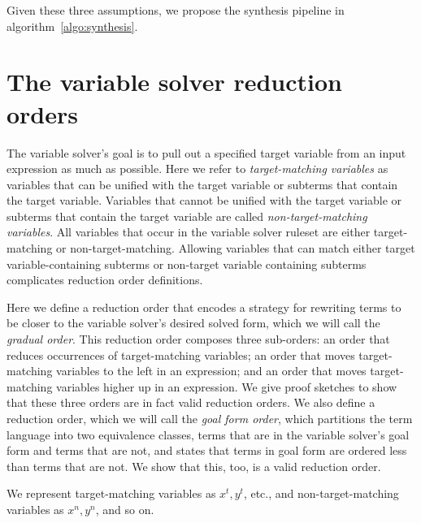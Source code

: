 Given these three assumptions, we propose the synthesis pipeline in algorithm~\ref{algo:synthesis}. 



\section{The variable solver reduction orders}

The variable solver's goal is to pull out a specified target variable from an input expression as much as possible.
Here we refer to \emph{target-matching variables} as variables that can be unified with the target variable or subterms that contain the target variable. Variables that cannot be unified with the target variable or subterms that contain the target variable are called \emph{non-target-matching variables}. All variables that occur in the variable solver ruleset are either target-matching or non-target-matching. Allowing variables that can match either target variable-containing subterms or non-target variable containing subterms complicates reduction order definitions. 

Here we define a reduction order that encodes a strategy for rewriting terms to be closer to the variable solver's desired solved form, which we will call the \emph{gradual order}. This reduction order composes three sub-orders: an order that reduces occurrences of target-matching variables; an order that moves target-matching variables to the left in an expression; and an order that moves target-matching variables higher up in an expression. We give proof sketches to show that these three orders are in fact valid reduction orders. We also define a reduction order, which we will call the \emph{goal form order}, which partitions the term language into two equivalence classes, terms that are in the variable solver's goal form and terms that are not, and states that terms in goal form are ordered less than terms that are not. We show that this, too, is a valid reduction order. 

We represent target-matching variables as $x^t, y^t$, etc., and non-target-matching variables as $x^n, y^n$, and so on.

